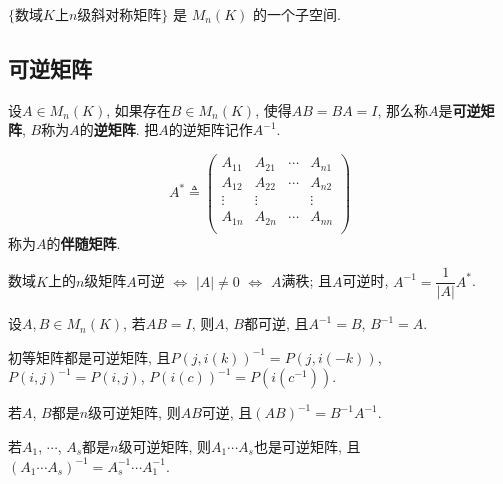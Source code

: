 \begin{Note}
$\{$数域$K$上$n$级斜对称矩阵$\}$ 是 $M_n(K)$ 的一个子空间.
\end{Note}

\subsection{可逆矩阵}

\begin{Definition}[可逆矩阵]
设$A \in M_n(K)$, 如果存在$B \in M_n(K)$, 使得$AB = BA = I$, 那么称$A$是\textbf{可逆矩阵}, $B$称为$A$的\textbf{逆矩阵}. 把$A$的逆矩阵记作$A^{-1}$.
\end{Definition}

\begin{Definition}[伴随矩阵]
\[
A^* \triangleq
\begin{pmatrix}
A_{11} & A_{21} & \cdots & A_{n1} \\
A_{12} & A_{22} & \cdots & A_{n2} \\
\vdots & \vdots &        & \vdots \\
A_{1n} & A_{2n} & \cdots & A_{nn} \\
\end{pmatrix}
\]
称为$A$的\textbf{伴随矩阵}.
\end{Definition}

\begin{Note}
数域$K$上的$n$级矩阵$A$可逆 $\iff$ $|A| \neq 0$ $\iff$ $A$满秩; 且$A$可逆时, $A^{-1} = \dfrac{1}{|A|}A^{*}$.
\end{Note}

\begin{Proposition}
设$A, B \in M_n(K)$, 若$AB = I$, 则$A$, $B$都可逆, 且$A^{-1} = B$, $B^{-1} = A$.
\end{Proposition}

\begin{Proposition}
初等矩阵都是可逆矩阵, 且$P(j, i(k))^{-1} = P(j, i(-k))$, $P(i, j)^{-1} = P(i, j)$, $P(i(c))^{-1} = P(i(c^{-1}))$.
\end{Proposition}

\begin{Proposition}
若$A$, $B$都是$n$级可逆矩阵, 则$AB$可逆, 且$(AB)^{-1} = B^{-1} A^{-1}$.
\end{Proposition}

\begin{Note}
若$A_1$, $\cdots$, $A_s$都是$n$级可逆矩阵, 则$A_1 \cdots A_s$也是可逆矩阵, 且$\left( A_1 \cdots A_s \right)^{-1} = A_s^{-1} \cdots A_1^{-1}$.
\end{Note}

